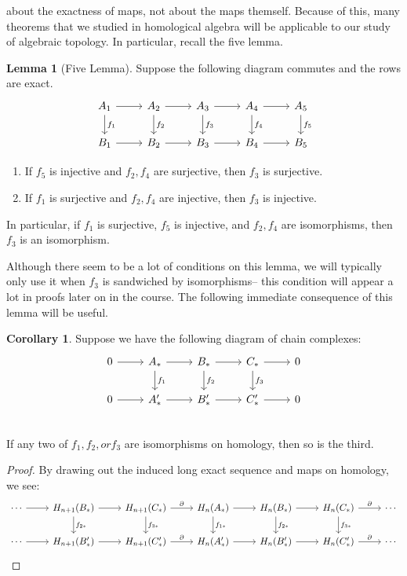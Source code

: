 \documentclass[11pt, oneside]{amsart}   	%
\theoremstyle{definition}
\newtheorem{corollary}{Corollary}[theorem]
\newtheorem{lemma}[theorem]{Lemma}
\begin{document}
about the exactness of maps, not about the maps themself. Because of this, many theorems that we studied in 
homological algebra will be applicable to our study of algebraic topology. In particular, recall the five lemma.
\begin{lemma}[Five Lemma]
	Suppose the following diagram commutes and the rows are exact.
	\begin{equation}\begin{tikzcd}
		A_1\arrow[r]\arrow[d, "f_1"] & A_2\arrow[r]\arrow[d, "f_2"] & A_3\arrow[r]\arrow[d, "f_3"] & A_4\arrow[r]\arrow[d, 
		"f_4"] & A_5\arrow[d, "f_5"] \\
		B_1\arrow[r] & B_2\arrow[r] & B_3\arrow[r] & B_4\arrow[r] & B_5
	\end{tikzcd}\end{equation}
\begin{enumerate}
	\item If $f_5$ is injective and $f_2, f_4$ are surjective, then $f_3$ is surjective.
	\item If $f_1$ is surjective and $f_2, f_4$ are injective, then $f_3$ is injective. 
\end{enumerate}
In particular, if $f_1$ is surjective, $f_5$ is injective, and $f_2, f_4$ are isomorphisms, then $f_3$ is an isomorphism.
\end{lemma}

Although there seem to be a lot of conditions on this lemma, we will typically only use it when $f_3$ is sandwiched by 
isomorphisms-- this condition will appear a lot in proofs later on in the course. The following immediate consequence of 
this lemma will be useful.

\begin{corollary}
	Suppose we have the following diagram of chain complexes:
	\[\begin{tikzcd}
		0\arrow[r] & A_*\arrow[r]\arrow[d, "f_1"] & B_*\arrow[r]\arrow[d, "f_2"] & C_*\arrow[r]\arrow[d, "f_3"] & 0 \\
		0\arrow[r] & A'_*\arrow[r] & B'_*\arrow[r] & C'_*\arrow[r] & 0 \\
	\end{tikzcd}\]
	If any two of $f_1, f_2, or f_3$ are isomorphisms on homology, then so is the third. 
\end{corollary}
\begin{proof}
	By drawing out the induced long exact sequence and maps on homology, we see:
	\begin{equation}\begin{tikzcd}
		\cdots\arrow[r] & H_{n + 1}(B_*)\arrow[r]\arrow[d, "f_{2*}"] & 
		H_{n + 1}(C_*)\arrow[r, "\partial"]\arrow[d, "f_{3*}"] & H_{n}(A_*)\arrow[r]\arrow[d, "f_{1*}"] & H_{n}(B_*)\arrow[r]
		\arrow[d, "f_{2*}"] & H_{n}(C_*)\arrow[r, "\partial"] \arrow[d, "f_{3*}"] & \cdots \\
		\cdots\arrow[r] & H_{n + 1}(B'_*)\arrow[r] & H_{n + 1}(C'_*)\arrow[r, "\partial"] & H_n(A'_*) 
		\arrow[r] & H_n(B'_*)\arrow[r] & H_n(C'_*)\arrow[r, "\partial"] & \cdots
	\end{tikzcd}\end{equation}
\end{proof}
\end{document}
